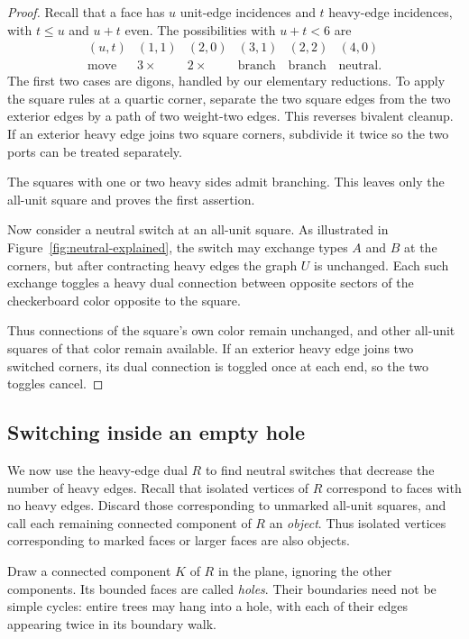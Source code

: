 \documentclass[11pt]{article}
\theoremstyle{definition}
\theoremstyle{remark}
\begin{document}
\begin{proof}
Recall that a face has $u$ unit-edge incidences
and $t$ heavy-edge incidences, with $t\le u$
and $u+t$ even. The possibilities with
$u+t<6$ are
\[
\begin{array}{c|ccccc}
(u,t)&(1,1)&(2,0)&(3,1)&(2,2)&(4,0)\\ \hline
\text{move}&3\times&2\times&
\text{branch}&\text{branch}&\text{neutral}.
\end{array}
\]
The first two cases are digons, handled by our elementary
reductions. To apply the square rules at a quartic corner,
separate the two square edges from the two exterior edges
by a path of two weight-two edges. This reverses bivalent
cleanup. If an exterior heavy edge joins two square corners,
subdivide it twice so the two ports can be treated separately.

The squares with one or two heavy sides admit branching.
This leaves only the all-unit square and proves the first
assertion.

Now consider a neutral switch at an all-unit
square. As illustrated in
Figure~\ref{fig:neutral-explained}, the switch
may exchange types $A$ and $B$ at the corners,
but after contracting heavy edges the graph
$U$ is unchanged. Each such exchange toggles
a heavy dual connection between opposite
sectors of the checkerboard color opposite
to the square. 

Thus connections of the square's own color remain unchanged,
and other all-unit squares of that color remain available.
If an exterior heavy edge joins two switched corners,
its dual connection is toggled once at each end, so
the two toggles cancel.
\end{proof}



\subsection{Switching inside an empty hole}

We now use the heavy-edge dual $R$ to find neutral
switches that decrease the number of heavy edges.
Recall that isolated vertices of $R$ correspond
to faces with no heavy edges. Discard those
corresponding to unmarked all-unit squares, and
call each remaining connected component of $R$
an \emph{object}. Thus isolated vertices
corresponding to marked faces or larger faces
are also objects.



Draw a connected component $K$ of $R$ in the plane,
ignoring the other components. Its bounded faces
are called \emph{holes}. Their boundaries need
not be simple cycles: entire trees may hang into
a hole, with each of their edges appearing twice
in its boundary walk.
\end{document}
